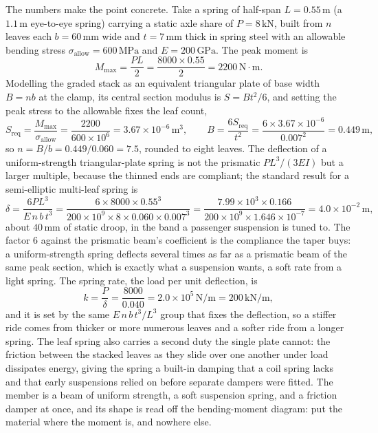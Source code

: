 The numbers make the point concrete. Take a spring of half-span $L =
0.55\,\si{\meter}$ (a $1.1\,\si{\meter}$ eye-to-eye spring) carrying a
static axle share of $P = 8\,\text{kN}$, built from $n$ leaves each
$b = 60\,\si{\milli\meter}$ wide and $t = 7\,\si{\milli\meter}$ thick in
spring steel with an allowable bending stress $\sigma_{\text{allow}} =
600\,\text{MPa}$ and $E = 200\,\text{GPa}$. The peak moment is
\[
M_{\max} = \frac{P L}{2} = \frac{8000 \times 0.55}{2}
= 2200\,\text{N}\cdot\text{m}.
\]
Modelling the graded stack as an equivalent triangular plate of base width
$B = n b$ at the clamp, its central section modulus is $S = B t^2/6$, and
setting the peak stress to the allowable fixes the leaf count,
\[
S_{\text{req}} = \frac{M_{\max}}{\sigma_{\text{allow}}}
= \frac{2200}{600 \times 10^6} = 3.67 \times 10^{-6}\,\si{\meter\cubed},
\qquad
B = \frac{6 S_{\text{req}}}{t^2}
= \frac{6 \times 3.67 \times 10^{-6}}{0.007^2} = 0.449\,\si{\meter},
\]
so $n = B/b = 0.449/0.060 = 7.5$, rounded to eight leaves. The deflection
of a uniform-strength triangular-plate spring is not the prismatic
$PL^3/(3EI)$ but a larger multiple, because the thinned ends are compliant;
the standard result for a semi-elliptic multi-leaf spring is
\[
\delta = \frac{6 P L^3}{E\,n\,b\,t^3}
= \frac{6 \times 8000 \times 0.55^3}{200 \times 10^9 \times 8 \times 0.060
\times 0.007^3}
= \frac{7.99 \times 10^3 \times 0.166}{200 \times 10^9 \times 1.646 \times
10^{-7}}
= 4.0 \times 10^{-2}\,\si{\meter},
\]
about $40\,\si{\milli\meter}$ of static droop, in the band a passenger
suspension is tuned to. The factor $6$ against the prismatic beam's
coefficient is the compliance the taper buys: a uniform-strength spring
deflects several times as far as a prismatic beam of the same peak section,
which is exactly what a suspension wants, a soft rate from a light spring.
The spring rate, the load per unit deflection, is
\[
k = \frac{P}{\delta} = \frac{8000}{0.040} = 2.0 \times 10^5\,\text{N}/
\si{\meter} = 200\,\text{kN}/\si{\meter},
\]
and it is set by the same $E\,n\,b\,t^3/L^3$ group that fixes the
deflection, so a stiffer ride comes from thicker or more numerous leaves
and a softer ride from a longer spring. The leaf spring also carries a
second duty the single plate cannot: the friction between the stacked
leaves as they slide over one another under load dissipates energy, giving
the spring a built-in damping that a coil spring lacks and that early
suspensions relied on before separate dampers were fitted. The member is a
beam of uniform strength, a soft suspension spring, and a friction damper
at once, and its shape is read off the bending-moment diagram: put the
material where the moment is, and nowhere else.

